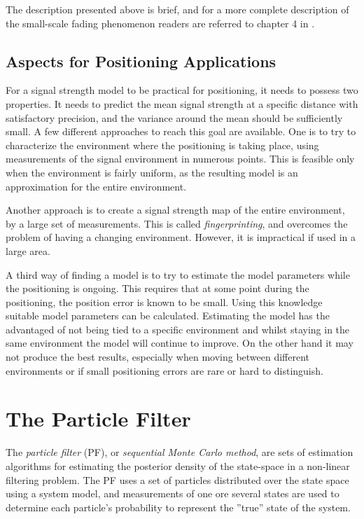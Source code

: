 \documentclass{LTHthesis}
\begin{document}
The description presented above is brief, and for a more complete description of the small-scale fading phenomenon readers are referred to chapter 4 in \cite{rappaport96}.  
 \section{Aspects for Positioning Applications}
 \label{sec:AfPA}
 For a signal strength model to be practical for positioning, it needs to possess two properties. It needs to predict the mean signal strength at a specific distance with satisfactory precision, and the variance around the mean should be sufficiently small. A few different approaches to reach this goal are available. One is to try to characterize the environment where the positioning is taking place, using measurements of the signal environment in numerous points. This is feasible only when the environment is fairly uniform, as the resulting model is an approximation for the entire environment. 
 
 Another approach is to create a signal strength map of the entire environment, by a large set of measurements. This is called \emph{fingerprinting}, and overcomes the problem of having a changing environment. However, it is impractical if used in a large area. 
 
 A third way of finding a model is to try to estimate the model parameters while the positioning is ongoing. This requires that at some point during the positioning, the position error is known to be small. Using this knowledge suitable model parameters can be calculated. Estimating the model has the advantaged of not being tied to a specific environment and whilst staying in the same environment the model will continue to improve. On the other hand it may not produce the best results, especially when moving between different environments or if small positioning errors are rare or hard to distinguish.        
\chapter{The Particle Filter}
\label{chap:PF}
%
The \emph{particle filter} (PF), or \emph{sequential Monte Carlo method}, are sets of estimation algorithms for estimating the posterior density of the state-space in a non-linear filtering problem. The PF uses a set of particles distributed over the state space using a system model, and measurements of one ore several states are used to determine each particle's probability to represent the ''true'' state of the system.  
\end{document}
